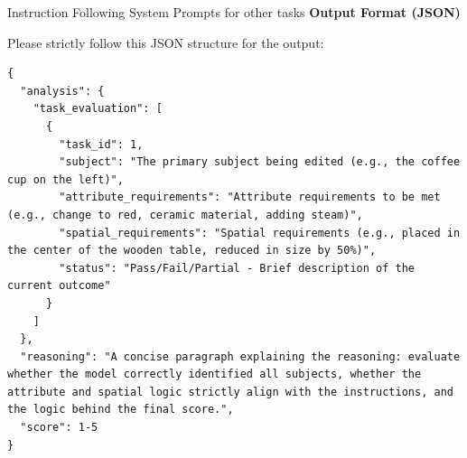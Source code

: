 \documentclass{llmxive}
\begin{document}
\begin{promptbox}[label={System Prompts: IF_other tasks}]{Instruction Following System Prompts for other tasks}
\textbf{Output Format (JSON)}

Please strictly follow this JSON structure for the output:

\begin{lstlisting}
{
  "analysis": {
    "task_evaluation": [
      {
        "task_id": 1,
        "subject": "The primary subject being edited (e.g., the coffee cup on the left)",
        "attribute_requirements": "Attribute requirements to be met (e.g., change to red, ceramic material, adding steam)",
        "spatial_requirements": "Spatial requirements (e.g., placed in the center of the wooden table, reduced in size by 50%)",
        "status": "Pass/Fail/Partial - Brief description of the current outcome"
      }
    ]
  },
  "reasoning": "A concise paragraph explaining the reasoning: evaluate whether the model correctly identified all subjects, whether the attribute and spatial logic strictly align with the instructions, and the logic behind the final score.",
  "score": 1-5
}
\end{lstlisting}

\end{promptbox}
\end{document}
